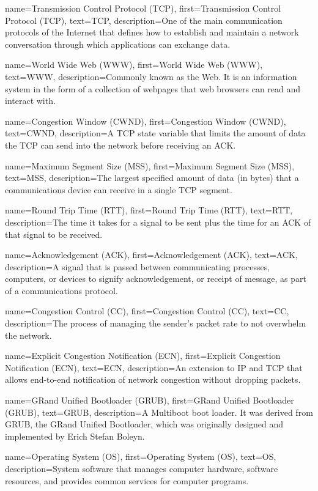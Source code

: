{
    name={Transmission Control Protocol (TCP)},
    first={Transmission Control Protocol (TCP)},
    text={TCP},
    description={One of the main communication protocols of the Internet that defines how to establish and maintain a network conversation through which applications can exchange data.}
}

{
    name={World Wide Web (WWW)},
    first={World Wide Web (WWW)},
    text={WWW},
    description={Commonly known as the Web. It is an information system in the form of a collection of webpages that web browsers can read and interact with.}
}

{
    name={Congestion Window (CWND)},
    first={Congestion Window (CWND)},
    text={CWND},
    description={A TCP state variable that limits the amount of data the TCP can send into the network before receiving an ACK.}
}

{
    name={Maximum Segment Size (MSS)},
    first={Maximum Segment Size (MSS)},
    text={MSS},
    description={The largest specified amount of data (in bytes) that a communications device can receive in a single TCP segment.}
}

{
    name={Round Trip Time (RTT)},
    first={Round Trip Time (RTT)},
    text={RTT},
    description={The time it takes for a signal to be sent plus the time for an ACK of that signal to be received.}
}

{
    name={Acknowledgement (ACK)},
    first={Acknowledgement (ACK)},
    text={ACK},
    description={A signal that is passed between communicating processes, computers, or devices to signify acknowledgement, or receipt of message, as part of a communications protocol.}
}

{
    name={Congestion Control (CC)},
    first={Congestion Control (CC)},
    text={CC},
    description={The process of managing the sender's packet rate to not overwhelm the network.}
}

{
    name={Explicit Congestion Notification (ECN)},
    first={Explicit Congestion Notification (ECN)},
    text={ECN},
    description={An extension to IP and TCP that allows end-to-end notification of network congestion without dropping packets.}
}

{
    name={GRand Unified Bootloader (GRUB)},
    first={GRand Unified Bootloader (GRUB)},
    text={GRUB},
    description={A Multiboot boot loader. It was derived from GRUB, the GRand Unified Bootloader, which was originally designed and implemented by Erich Stefan Boleyn.}
}

{
    name={Operating System (OS)},
    first={Operating System (OS)},
    text={OS},
    description={System software that manages computer hardware, software resources, and provides common services for computer programs.}
}